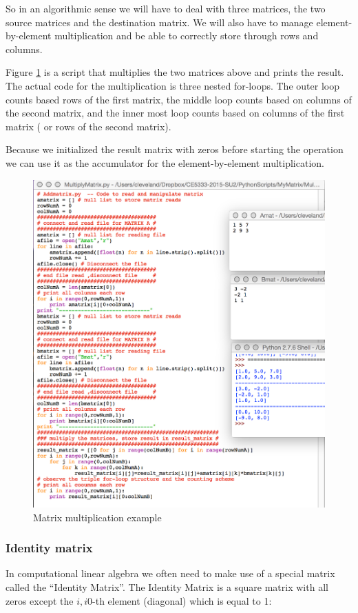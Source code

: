 So in an algorithmic sense we will have to deal with three matrices, the two source matrices and the destination matrix.  
We will also have to manage element-by-element multiplication and be able to correctly store through rows and columns.

Figure \ref{fig:MultiplyMatrix} is a script that multiplies the two matrices above and prints the result.   
The actual code for the multiplication is three nested for-loops.  
The outer loop counts based rows of the first matrix, the middle loop counts based on columns of the second matrix, and the inner most loop counts based on columns of the first matrix ( or rows of the second matrix).   

Because we initialized the result matrix with zeros before starting the operation we can use it as the accumulator for the element-by-element multiplication.

\begin{figure}[h!] %
   \centering
   \includegraphics[width=6in]{./9-Matrix/MultiplyMatrix.jpg} 
   \caption{Matrix multiplication example}
   \label{fig:MultiplyMatrix}
\end{figure}
\clearpage
\subsubsection{Identity matrix}
In computational linear algebra we often need to make use of a special matrix called the ``Identity Matrix''.  
The Identity Matrix is a square matrix with all zeros except the $i,i$0-th element (diagonal) which is equal to 1:


